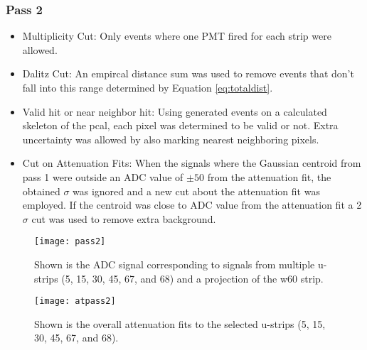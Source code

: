 \subsubsection{Pass 2}
\begin{itemize}
    \item Multiplicity Cut: Only events where one PMT fired for each strip were allowed.
    \item Dalitz Cut: An empircal distance sum was used to remove events that don't fall 
    into this range determined by Equation \ref{eq:totaldist}.
    \item Valid hit or near neighbor hit: Using generated events on a calculated skeleton 
    of the pcal, each pixel was determined to be valid or not. Extra uncertainty was allowed 
    by also marking nearest neighboring pixels.
    \item Cut on Attenuation Fits: When the signals where the Gaussian centroid from pass 1 
    were outside an ADC value of $\pm50$ from the attenuation fit, the obtained $\sigma$ was 
    ignored and a new cut about the attenuation fit was employed. If the centroid was close 
    to ADC value from the attenuation fit a 2$\sigma$ cut was used to remove extra background.
\end{itemize}


\begin{figure}[h]
    \centering
    \texttt{[image: pass2]}
    \caption{Shown is the ADC signal corresponding to signals from multiple u-strips 
    (5, 15, 30, 45, 67, and 68) and a projection of the w60 strip.}
    \label{fig:pass2}
\end{figure}

\begin{figure}[h]
    \centering
    \texttt{[image: atpass2]}
    \caption{Shown is the overall attenuation fits to the selected u-strips 
    (5, 15, 30, 45, 67, and 68).}
    \label{fig:atpass2}
\end{figure}



\clearpage
\FloatBarrier
